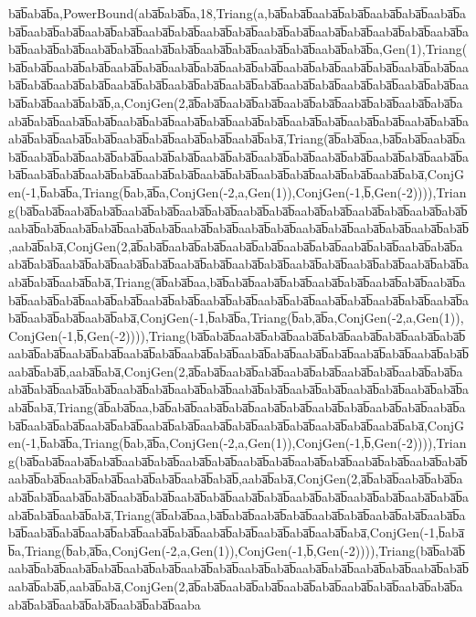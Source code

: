 ba̅b̅aba̅b̅a,PowerBound(aba̅b̅aba̅b̅a,18,Triang(a,ba̅b̅aba̅b̅aaba̅b̅aba̅b̅aaba̅b̅aba̅b̅aaba̅b̅aba̅b̅aaba̅b̅aba̅b̅aaba̅b̅aba̅b̅aaba̅b̅aba̅b̅aaba̅b̅aba̅b̅aaba̅b̅aba̅b̅aaba̅b̅aba̅b̅aaba̅b̅aba̅b̅aaba̅b̅aba̅b̅aaba̅b̅aba̅b̅aaba̅b̅aba̅b̅aaba̅b̅aba̅b̅aaba̅b̅aba̅b̅aaba̅b̅aba̅b̅aaba̅b̅aba̅b̅a,Gen(1),Triang(ba̅b̅aba̅b̅aaba̅b̅aba̅b̅aaba̅b̅aba̅b̅aaba̅b̅aba̅b̅aaba̅b̅aba̅b̅aaba̅b̅aba̅b̅aaba̅b̅aba̅b̅aaba̅b̅aba̅b̅aaba̅b̅aba̅b̅aaba̅b̅aba̅b̅aaba̅b̅aba̅b̅aaba̅b̅aba̅b̅aaba̅b̅aba̅b̅aaba̅b̅aba̅b̅aaba̅b̅aba̅b̅aaba̅b̅aba̅b̅aaba̅b̅aba̅b̅aaba̅b̅aba̅b̅,a,ConjGen(2,a̅b̅aba̅b̅aaba̅b̅aba̅b̅aaba̅b̅aba̅b̅aaba̅b̅aba̅b̅aaba̅b̅aba̅b̅aaba̅b̅aba̅b̅aaba̅b̅aba̅b̅aaba̅b̅aba̅b̅aaba̅b̅aba̅b̅aaba̅b̅aba̅b̅aaba̅b̅aba̅b̅aaba̅b̅aba̅b̅aaba̅b̅aba̅b̅aaba̅b̅aba̅b̅aaba̅b̅aba̅b̅aaba̅b̅aba̅b̅aaba̅b̅aba̅b̅aaba̅b̅aba̅,Triang(a̅b̅aba̅b̅aa,ba̅b̅aba̅b̅aaba̅b̅aba̅b̅aaba̅b̅aba̅b̅aaba̅b̅aba̅b̅aaba̅b̅aba̅b̅aaba̅b̅aba̅b̅aaba̅b̅aba̅b̅aaba̅b̅aba̅b̅aaba̅b̅aba̅b̅aaba̅b̅aba̅b̅aaba̅b̅aba̅b̅aaba̅b̅aba̅b̅aaba̅b̅aba̅b̅aaba̅b̅aba̅b̅aaba̅b̅aba̅b̅aaba̅b̅aba̅b̅aaba̅b̅aba̅,ConjGen(-1,b̅aba̅b̅a,Triang(b̅ab,a̅b̅a,ConjGen(-2,a,Gen(1)),ConjGen(-1,b̅,Gen(-2)))),Triang(ba̅b̅aba̅b̅aaba̅b̅aba̅b̅aaba̅b̅aba̅b̅aaba̅b̅aba̅b̅aaba̅b̅aba̅b̅aaba̅b̅aba̅b̅aaba̅b̅aba̅b̅aaba̅b̅aba̅b̅aaba̅b̅aba̅b̅aaba̅b̅aba̅b̅aaba̅b̅aba̅b̅aaba̅b̅aba̅b̅aaba̅b̅aba̅b̅aaba̅b̅aba̅b̅aaba̅b̅aba̅b̅aaba̅b̅aba̅b̅,aaba̅b̅aba̅,ConjGen(2,a̅b̅aba̅b̅aaba̅b̅aba̅b̅aaba̅b̅aba̅b̅aaba̅b̅aba̅b̅aaba̅b̅aba̅b̅aaba̅b̅aba̅b̅aaba̅b̅aba̅b̅aaba̅b̅aba̅b̅aaba̅b̅aba̅b̅aaba̅b̅aba̅b̅aaba̅b̅aba̅b̅aaba̅b̅aba̅b̅aaba̅b̅aba̅b̅aaba̅b̅aba̅b̅aaba̅b̅aba̅b̅aaba̅b̅aba̅,Triang(a̅b̅aba̅b̅aa,ba̅b̅aba̅b̅aaba̅b̅aba̅b̅aaba̅b̅aba̅b̅aaba̅b̅aba̅b̅aaba̅b̅aba̅b̅aaba̅b̅aba̅b̅aaba̅b̅aba̅b̅aaba̅b̅aba̅b̅aaba̅b̅aba̅b̅aaba̅b̅aba̅b̅aaba̅b̅aba̅b̅aaba̅b̅aba̅b̅aaba̅b̅aba̅b̅aaba̅b̅aba̅b̅aaba̅b̅aba̅,ConjGen(-1,b̅aba̅b̅a,Triang(b̅ab,a̅b̅a,ConjGen(-2,a,Gen(1)),ConjGen(-1,b̅,Gen(-2)))),Triang(ba̅b̅aba̅b̅aaba̅b̅aba̅b̅aaba̅b̅aba̅b̅aaba̅b̅aba̅b̅aaba̅b̅aba̅b̅aaba̅b̅aba̅b̅aaba̅b̅aba̅b̅aaba̅b̅aba̅b̅aaba̅b̅aba̅b̅aaba̅b̅aba̅b̅aaba̅b̅aba̅b̅aaba̅b̅aba̅b̅aaba̅b̅aba̅b̅aaba̅b̅aba̅b̅,aaba̅b̅aba̅,ConjGen(2,a̅b̅aba̅b̅aaba̅b̅aba̅b̅aaba̅b̅aba̅b̅aaba̅b̅aba̅b̅aaba̅b̅aba̅b̅aaba̅b̅aba̅b̅aaba̅b̅aba̅b̅aaba̅b̅aba̅b̅aaba̅b̅aba̅b̅aaba̅b̅aba̅b̅aaba̅b̅aba̅b̅aaba̅b̅aba̅b̅aaba̅b̅aba̅b̅aaba̅b̅aba̅,Triang(a̅b̅aba̅b̅aa,ba̅b̅aba̅b̅aaba̅b̅aba̅b̅aaba̅b̅aba̅b̅aaba̅b̅aba̅b̅aaba̅b̅aba̅b̅aaba̅b̅aba̅b̅aaba̅b̅aba̅b̅aaba̅b̅aba̅b̅aaba̅b̅aba̅b̅aaba̅b̅aba̅b̅aaba̅b̅aba̅b̅aaba̅b̅aba̅b̅aaba̅b̅aba̅,ConjGen(-1,b̅aba̅b̅a,Triang(b̅ab,a̅b̅a,ConjGen(-2,a,Gen(1)),ConjGen(-1,b̅,Gen(-2)))),Triang(ba̅b̅aba̅b̅aaba̅b̅aba̅b̅aaba̅b̅aba̅b̅aaba̅b̅aba̅b̅aaba̅b̅aba̅b̅aaba̅b̅aba̅b̅aaba̅b̅aba̅b̅aaba̅b̅aba̅b̅aaba̅b̅aba̅b̅aaba̅b̅aba̅b̅aaba̅b̅aba̅b̅aaba̅b̅aba̅b̅,aaba̅b̅aba̅,ConjGen(2,a̅b̅aba̅b̅aaba̅b̅aba̅b̅aaba̅b̅aba̅b̅aaba̅b̅aba̅b̅aaba̅b̅aba̅b̅aaba̅b̅aba̅b̅aaba̅b̅aba̅b̅aaba̅b̅aba̅b̅aaba̅b̅aba̅b̅aaba̅b̅aba̅b̅aaba̅b̅aba̅b̅aaba̅b̅aba̅,Triang(a̅b̅aba̅b̅aa,ba̅b̅aba̅b̅aaba̅b̅aba̅b̅aaba̅b̅aba̅b̅aaba̅b̅aba̅b̅aaba̅b̅aba̅b̅aaba̅b̅aba̅b̅aaba̅b̅aba̅b̅aaba̅b̅aba̅b̅aaba̅b̅aba̅b̅aaba̅b̅aba̅b̅aaba̅b̅aba̅,ConjGen(-1,b̅aba̅b̅a,Triang(b̅ab,a̅b̅a,ConjGen(-2,a,Gen(1)),ConjGen(-1,b̅,Gen(-2)))),Triang(ba̅b̅aba̅b̅aaba̅b̅aba̅b̅aaba̅b̅aba̅b̅aaba̅b̅aba̅b̅aaba̅b̅aba̅b̅aaba̅b̅aba̅b̅aaba̅b̅aba̅b̅aaba̅b̅aba̅b̅aaba̅b̅aba̅b̅aaba̅b̅aba̅b̅,aaba̅b̅aba̅,ConjGen(2,a̅b̅aba̅b̅aaba̅b̅aba̅b̅aaba̅b̅aba̅b̅aaba̅b̅aba̅b̅aaba̅b̅aba̅b̅aaba̅b̅aba̅b̅aaba̅b̅aba̅b̅aaba̅b̅aba̅b̅aaba